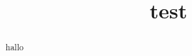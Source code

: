 \documentclass[]{article}
\title{test}
\author{}
\begin{document}
\maketitle

\begin{abstract}
hallo

\end{abstract}

\section{}
\end{document}
